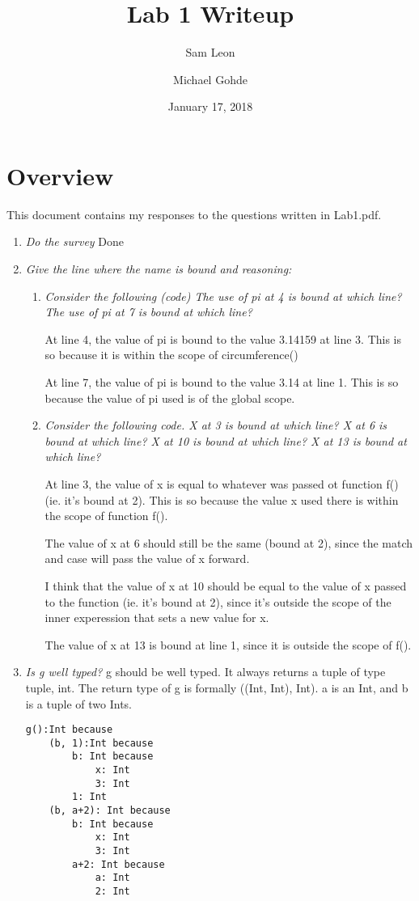 \documentclass[12pt,letterpaper]{article}
\begin{document}
\title{Lab 1 Writeup}
\author{Sam Leon}
\author{Michael Gohde}
\date{January 17, 2018}
\maketitle

\section{Overview}
This document contains my responses to the questions written in Lab1.pdf.

\begin{enumerate}
\item \textit{Do the survey}
Done

\item \textit{Give the line where the name is bound and reasoning:}
\begin{enumerate}
    \item \textit{Consider the following (code) The use of pi at 4 is bound at which line? The use of pi at 7 is bound at which line?}

    At line 4, the value of pi is bound to the value 3.14159 at line 3. This is so because it is within the scope of circumference()

    At line 7, the value of pi is bound to the value 3.14 at line 1. This is so because the value of pi used is of the global scope.

    \item \textit{Consider the following code. X at 3 is bound at which line? X at 6 is bound at which line? X at 10 is bound at which line? X at 13 is bound at which line?}
    
    At line 3, the value of x is equal to whatever was passed ot function f() (ie. it's bound at 2). This is so because the value x used there
    is within the scope of function f().
    
    The value of x at 6 should still be the same (bound at 2), since the match and case will pass the value of x forward.
    
    I think that the value of x at 10 should be equal to the value of x passed to the function (ie. it's bound at 2), since it's outside the scope of the inner experession that sets a new value for x.
    
    The value of x at 13 is bound at line 1, since it is outside the scope of f().
\end{enumerate}

\item \textit{Is g well typed?}
g should be well typed. It always returns a tuple of type tuple, int. The return type of g is formally ((Int, Int), Int). a is an Int, and b is a tuple of two Ints. 

\begin{verbatim}
g():Int because
    (b, 1):Int because
        b: Int because
            x: Int
            3: Int
        1: Int
    (b, a+2): Int because
        b: Int because
            x: Int
            3: Int
        a+2: Int because
            a: Int
            2: Int
\end{verbatim}
\end{enumerate}
\end{document}
